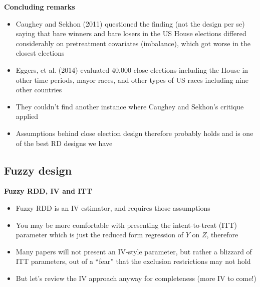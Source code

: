 \documentclass[notes=show]{beamer}
\begin{document}
\begin{frame}[plain]
\begin{center}
\textbf{Concluding remarks}
\end{center}

\begin{itemize}
\item Caughey and Sekhon (2011) questioned the finding (not the design per se) saying that bare winners and bare losers in the US House elections differed considerably on pretreatment covariates (imbalance), which got worse in the closest elections
\item Eggers, et al. (2014) evaluated 40,000 close elections including the House in other time periods, mayor races, and other types of US races including nine other countries
\item They couldn't find another instance where Caughey and Sekhon's critique applied
\item Assumptions behind close election design therefore probably holds and is one of the best RD designs we have
\end{itemize}

\end{frame}

\subsection{Fuzzy design}


\begin{frame}
\begin{center}
\textbf{Fuzzy RDD, IV and ITT}
\end{center}

\begin{itemize}
		\item Fuzzy RDD is an IV estimator, and requires those assumptions
		\item You may be more comfortable with presenting the intent-to-treat (ITT) parameter which is just the reduced form regression of $Y$ on $Z$, therefore
		\item Many papers will not present an IV-style parameter, but rather a blizzard of ITT parameters, out of a ``fear'' that the exclusion restrictions may not hold
		\item But let's review the IV approach anyway for completeness (more IV to come!)
\end{itemize}

\end{frame}
\end{document}
